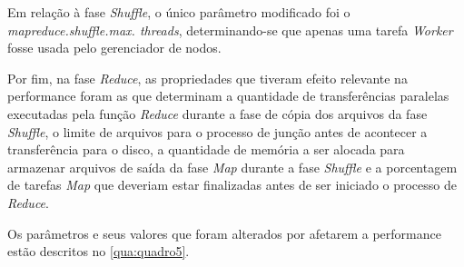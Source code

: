 Em relação à fase \textit{Shuffle}, o único parâmetro modificado foi o \textit{mapreduce.shuffle.max. threads}, determinando-se que apenas uma tarefa \textit{Worker} fosse usada pelo gerenciador de nodos.

Por fim, na fase \textit{Reduce}, as propriedades que tiveram efeito relevante na performance foram as que determinam a quantidade de transferências paralelas executadas pela função \textit{Reduce} durante a fase de cópia dos arquivos da fase \textit{Shuffle}, o limite de arquivos para o processo de junção antes de acontecer a transferência para o disco, a quantidade de memória a ser alocada para armazenar arquivos de saída da fase \textit{Map} durante a fase \textit{Shuffle} e a porcentagem de tarefas \textit{Map} que deveriam estar finalizadas antes de ser iniciado o processo de \textit{Reduce}.

Os parâmetros e seus valores que foram alterados por afetarem a performance estão descritos no \autoref{qua:quadro5}.

